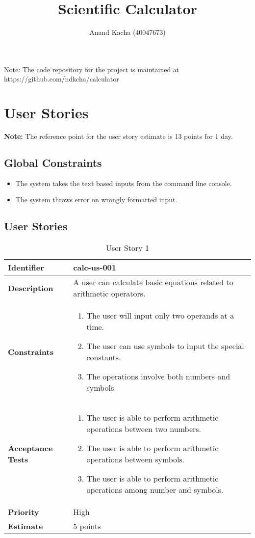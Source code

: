 \documentclass{article}
\title{Scientific Calculator}
\author{Anand Kacha (40047673)}
\begin{document}
\begin{flushleft}
Note: The code repository for the project is maintained at https://github.com/ndkcha/calculator
\end{flushleft}
\tableofcontents
\listoffigures
\listoftables

\clearpage

\section{User Stories}
\begin{flushleft}
\textbf{Note:} The reference point for the user story estimate is 13 points for 1 day.
\end{flushleft}

\subsection{Global Constraints}
\begin{itemize}
    \item The system takes the text based inputs from the command line console.
    \item The system throws error on wrongly formatted input.
\end{itemize}

\subsection{User Stories}
\begin{table}[h]
\centering
\begin{tabular}{|p{2.2cm}|p{12cm}|}
\hline
\textbf{Identifier} & {calc-us-001} \\
\hline
\textbf{Description} & {A user can calculate basic equations related to arithmetic operators.}\\
\hline
\textbf{Constraints} & 
\begin{enumerate}
    \item The user will input only two operands at a time.
    \item The user can use symbols to input the special constants.
    \item The operations involve both numbers and symbols.
\end{enumerate}\\
\hline
\textbf{Acceptance Tests} & 
\begin{enumerate}
    \item The user is able to perform arithmetic operations between two numbers.
    \item The user is able to perform arithmetic operations between symbols.
    \item The user is able to perform arithmetic operations among number and symbols.
\end{enumerate}\\
\hline
\textbf{Priority} & {High}\\
\hline
\textbf{Estimate} & {5 points}\\
\hline
\end{tabular}
\caption{User Story 1}
\end{table}
\end{document}
